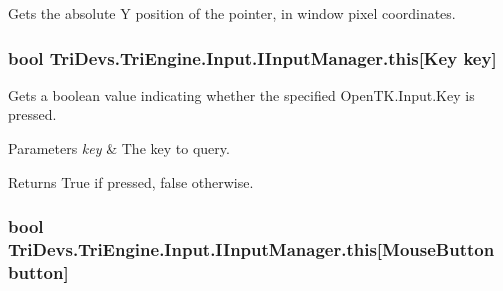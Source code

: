 Gets the absolute Y position of the pointer, in window pixel coordinates. 

\hypertarget{interface_tri_devs_1_1_tri_engine_1_1_input_1_1_i_input_manager_a254f095d63315114c7a8f41c4aac695e}{
\subsubsection[{this[Key key]}]{\setlength{\rightskip}{0pt plus 5cm}bool Tri\-Devs.\-Tri\-Engine.\-Input.\-I\-Input\-Manager.\-this\mbox{[}Key key\mbox{]}\hspace{0.3cm}{\ttfamily [get]}}}\label{interface_tri_devs_1_1_tri_engine_1_1_input_1_1_i_input_manager_a254f095d63315114c7a8f41c4aac695e}


Gets a boolean value indicating whether the specified Open\-T\-K.\-Input.\-Key is pressed. 


\begin{DoxyParams}{Parameters}
{\em key} & The key to query.\\
\hline
\end{DoxyParams}
\begin{DoxyReturn}{Returns}
True if pressed, false otherwise.
\end{DoxyReturn}
\hypertarget{interface_tri_devs_1_1_tri_engine_1_1_input_1_1_i_input_manager_ad35176c53bff7945cfb07a801f5d67c5}{
\subsubsection[{this[Mouse\-Button button]}]{\setlength{\rightskip}{0pt plus 5cm}bool Tri\-Devs.\-Tri\-Engine.\-Input.\-I\-Input\-Manager.\-this\mbox{[}Mouse\-Button button\mbox{]}\hspace{0.3cm}{\ttfamily [get]}}}\label{interface_tri_devs_1_1_tri_engine_1_1_input_1_1_i_input_manager_ad35176c53bff7945cfb07a801f5d67c5}


